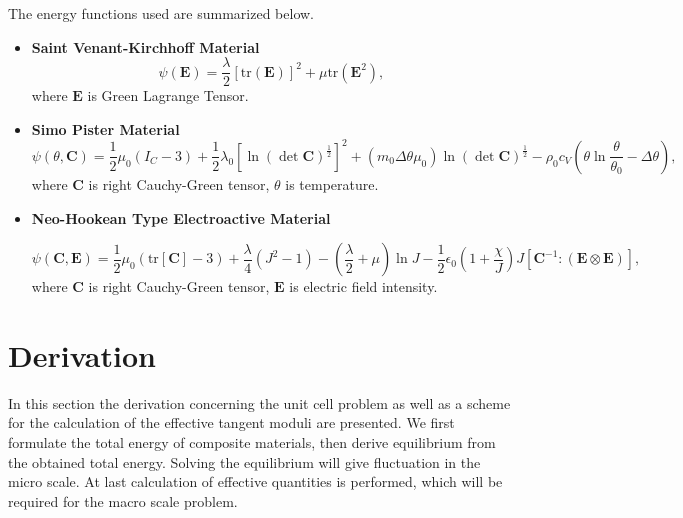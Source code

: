 \documentclass[10pt,a4paper]{scrreprt}
\begin{document}
The energy functions used are summarized below.
\begin{itemize}
	\item[] \textbf{Saint Venant-Kirchhoff Material} \citep{marsden_mathematical_1994}
	\begin{equation}
	\label{eq: svk}
	\psi\left( \mathbf{E} \right) = \dfrac{\lambda}{2} \left[ \text{tr}(\mathbf{E}) \right]^{2} + \mu \text{tr} \left( \mathbf{E}^{2} \right),
	\end{equation}
	where $\mathbf{E}$ is Green Lagrange Tensor.
	
	\item[] \textbf{Simo Pister Material} \citep{wriggers_coupled_1992}
	\begin{equation}
	\label{eq: sp mat}
	\psi\left( \theta, \mathbf{C} \right) = \frac{1}{2}\mu_{0} \left( I_{C}-3 \right) + \frac{1}{2} \lambda_{0} \left[ \ln \left( \det \mathbf{C} \right)^{\frac{1}{2}} \right]^{2} + \left( m_{0}\Delta \theta \mu_{0}\right) \ln (\det \mathbf{C})^{\frac{1}{2}} - \rho_{0} c_{V} \left( \theta \ln\dfrac{\theta}{\theta_{0}} - \Delta \theta \right),
	\end{equation}
	where $\mathbf{C}$ is right Cauchy-Green tensor, $\theta$ is temperature.
	
	\item[] \textbf{Neo-Hookean Type Electroactive Material} \citep{keip_two-scale_2014} 

	\begin{equation}
	\label{eq: nhk}
	\psi\left( \mathbf{C}, \mathbf{E} \right) =  \frac{1}{2}\mu_{0} \left( \text{tr}[\mathbf{C}]-3 \right) + \dfrac{\lambda}{4} \left( J^{2}-1 \right) - \left( \dfrac{\lambda}{2} + \mu \right) \ln J - \frac{1}{2} \epsilon_{0} \left( 1+\dfrac{\chi}{J} \right) J \left[ \mathbf{C}^{-1}: (\mathbf{E} \otimes \mathbf{E}) \right],
	\end{equation}
	where $\mathbf{C}$ is right Cauchy-Green tensor, $\mathbf{E}$ is electric field intensity.
	
\end{itemize}


\section{Derivation}
In this section the derivation concerning the unit cell problem as well as a scheme for the calculation of the effective tangent moduli are presented. We first formulate the total energy of composite materials, then derive equilibrium from the obtained total energy. Solving the equilibrium will give fluctuation in the micro scale. At last calculation of effective quantities is performed, which will be required for the macro scale problem.
\end{document}
